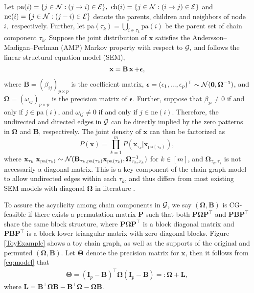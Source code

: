 \documentclass[12pt]{article}
\def\bx{\mathop{\bf x}}
\newcommand{\eee}{\boldsymbol \epsilon}
\newcommand{\OOO}{\boldsymbol \Omega}
\newcommand{\TTT}{\boldsymbol \Theta}
\newcommand{\BB}{\mathbf B}
\newcommand{\PP}{\mathbf P}
\newcommand{\xx}{\mathbf x}
\newcommand{\pa}{\text{pa}}
\newcommand{\1}{\uppercase\expandafter{\romannumeral1}}
\newcommand{\2}{\uppercase\expandafter{\romannumeral2}}
\newcommand{\0}{\textbf{0}}
\begin{document}
Let $\pa(i) = \{ j\in {\cal N} : (j\rightarrow i) \in {\cal E}\},~\mbox{ch}(i)=\{j\in {\cal N} : (i\rightarrow j) \in {\cal E}\}$ and $\mbox{ne}(i) = \{ j\in {\cal N} :  (j-i) \in {\cal E}\}$ denote the parents, children and neighbors of node $i,$ respectively. Further, let $\pa(\tau_k)=\bigcup_{i \in \tau_k} \pa(i)$ be the parent set of chain component $\tau_k$. Suppose the joint distribution of $\xx$ satisfies the Andersson–Madigan–Perlman (AMP) Markov property \citep{Andersson2001, Levitz2001} with respect to ${\cal G},$ and follows the linear structural equation model (SEM),
\begin{align}\label{eq:model}
	\bx = \mathbf{B} \bx + \eee,
\end{align}
where $\mathbf{B} = (\beta_{ij})_{p\times p}$ is the coefficient matrix, $\eee = (\epsilon_1,...,\epsilon_p)^\top \sim {\cal N} (\mathbf{0}, \mathbf{\Omega}^{-1})$, and $\mathbf{\Omega}=(\omega_{ij})_{p\times p}$ is the precision matrix of $\eee$. 
Further, suppose that $\beta_{ji} \neq 0$ if and only if $j\in \pa(i)$, and $\omega_{ij}\neq 0$ if and only if $j\in \mbox{ne}(i)$.
Therefore, the undirected and directed edges in $\cal G$ can be directly implied by the zero patterns in $\OOO$ and $\BB$, respectively. 
The joint density of $\xx$ can then be factorized as 
\begin{equation}\label{eq:factorization}
P(\xx)=\prod_{k=1}^m P(\xx_{\tau_k} | \xx_{\pa(\tau_k)}),
\end{equation}
where $\mathbf{x}_{\tau_k} | \mathbf{x}_{\pa(\tau_k)}   \sim {\cal N} (\mathbf{B}_{\tau_k, \pa(\tau_k)} \mathbf{x}_{\pa(\tau_k)}, \mathbf{\Omega}_{\tau_k,\tau_k}^{-1})$ for $k\in[m]$, and  $\mathbf{\Omega}_{\tau_k,\tau_k}$ is not necessarily a diagonal matrix. This is a key component of the chain graph model to allow undirected edges within each $\tau_k$, and thus differs from most existing SEM models with diagonal $\mathbf{\Omega}$ in literature \cite{Peters2017, Peters2014, Park2020, ChenW2019}. 


To assure the acyclicity among chain components in $\cal G$, we say $(\OOO,\BB)$ is CG-feasible if there exists a permutation matrix $\PP$ such that both $\PP\OOO\PP^\top$ and $\PP\BB\PP^\top$ share the same block structure, where $\PP\OOO\PP^\top$ is a block diagonal matrix and $\PP\BB\PP^\top$ is a block lower triangular matrix with zero diagonal blocks. Figure \ref{ToyExample} shows a toy chain graph, as well as the supports of the original and permuted $(\OOO,\BB)$. Let $\TTT$ denote the precision matrix for $\xx$, then it follows from \eqref{eq:model} that 
\begin{align} \label{eq::decom}
	\mathbf{\Theta}=(\mathbf{I}_p-\mathbf{B})^\top \mathbf{\Omega} (\mathbf{I}_p-\mathbf{B}) =: \mathbf{\Omega} + \mathbf{L},
\end{align}
where $\mathbf{L} = \mathbf{B}^\top \mathbf{\Omega}\mathbf{B} - \mathbf{B}^{\top} \mathbf{\Omega} - \mathbf{\Omega}\mathbf{B}$. 
\end{document}
